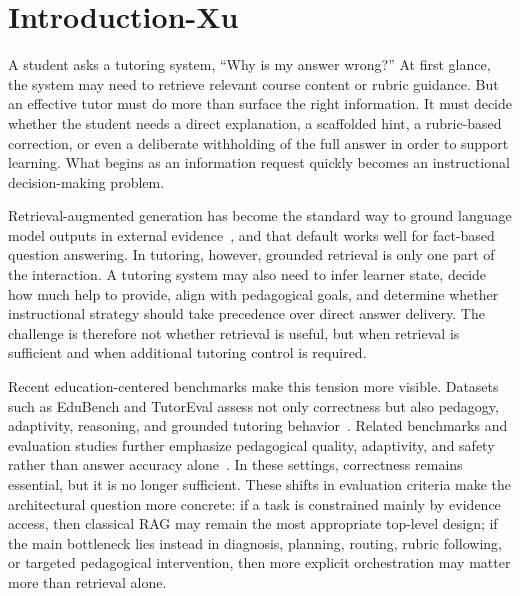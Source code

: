 \section{Introduction-Xu}

A student asks a tutoring system, ``Why is my answer wrong?'' At first glance, the system may need to retrieve relevant course content or rubric guidance. But an effective tutor must do more than surface the right information. It must decide whether the student needs a direct explanation, a scaffolded hint, a rubric-based correction, or even a deliberate withholding of the full answer in order to support learning. What begins as an information request quickly becomes an instructional decision-making problem.

Retrieval-augmented generation has become the standard way to ground language model outputs in external evidence~\cite{lewis2020rag}, and that default works well for fact-based question answering. In tutoring, however, grounded retrieval is only one part of the interaction. A tutoring system may also need to infer learner state, decide how much help to provide, align with pedagogical goals, and determine whether instructional strategy should take precedence over direct answer delivery. The challenge is therefore not whether retrieval is useful, but when retrieval is sufficient and when additional tutoring control is required.

Recent education-centered benchmarks make this tension more visible. Datasets such as EduBench and TutorEval assess not only correctness but also pedagogy, adaptivity, reasoning, and grounded tutoring behavior~\cite{xu2025edubench,chevalier2024sciencetutors,lmsciencetutorrepo}. Related benchmarks and evaluation studies further emphasize pedagogical quality, adaptivity, and safety rather than answer accuracy alone~\cite{macina2025mathtutorbench,srinivasa2025tutorbench,maurya2025aitutoreval,borchers2025adaptivity,hazra2026safetutors,shi2026kmpbench}. In these settings, correctness remains essential, but it is no longer sufficient. These shifts in evaluation criteria make the architectural question more concrete: if a task is constrained mainly by evidence access, then classical RAG may remain the most appropriate top-level design; if the main bottleneck lies instead in diagnosis, planning, routing, rubric following, or targeted pedagogical intervention, then more explicit orchestration may matter more than retrieval alone.

